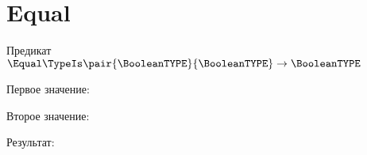 \section{Equal}
\begin{frame}{Предикат $\Equal\TypeIs\pair{\BooleanTYPE}{\BooleanTYPE}\to\BooleanTYPE$}

	Первое значение:


	Второе значение:


	Результат:

\end{frame}
